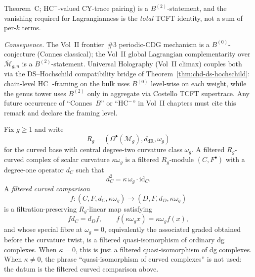\begin{remark}
\begin{enumerate}[label=\textup{(\alph*)}]
Theorem~C; $\mathrm{HC}^-$-valued CY-trace pairing\textup{)} is
a $B^{(2)}$-statement, and the vanishing required for
Lagrangianness is the \emph{total} TCFT identity, not a sum of
per-$k$ terms.
\end{enumerate}
\emph{Consequence.} The Vol~II frontier~\#3 periodic-CDG mechanism is a
$B^{(0)}$-conjecture \textup{(}Connes classical\textup{)}; the Vol~II
global Lagrangian complementarity over
$\overline{\mathcal{M}}_{g,n}$ is a $B^{(2)}$-statement. Universal
Holography \textup{(}Vol~II climax\textup{)} couples both via the
DS--Hochschild compatibility bridge of
Theorem~\ref{thm:chd-ds-hochschild}: chain-level
$\mathrm{HC}^-$-framing on the bulk uses $B^{(0)}$
level-wise on each weight, while the genus tower uses $B^{(2)}$
only in aggregate via Costello TCFT supertrace. Any future
occurrence of ``Connes~$B$'' or ``$\mathrm{HC}^-$'' in Vol~II
chapters must cite this remark and declare the framing level.
\end{remark}

\begin{definition}
\label{def:filtered-curved-comparison}
Fix \(g\geq1\) and write
\[
R_g=(\Omega^\bullet(\overline{\mathcal M}_g),d_{\mathrm{dR}},\omega_g)
\]
for the curved base with central degree-two curvature class
\(\omega_g\).  A filtered \(R_g\)-curved complex of scalar curvature
\(\kappa\omega_g\) is a filtered \(R_g\)-module \((C,F^\bullet)\) with
a degree-one operator \(d_C\) such that
\[
d_C^2=\kappa\,\omega_g\cdot \mathrm{id}_C .
\]
A \emph{filtered curved comparison}
\[
f\colon (C,F,d_C,\kappa\omega_g)\longrightarrow
(D,F,d_D,\kappa\omega_g)
\]
is a filtration-preserving \(R_g\)-linear map satisfying
\[
f d_C=d_D f,\qquad
f(\kappa\omega_g x)=\kappa\omega_g f(x),
\]
and whose special fibre at \(\omega_g=0\), equivalently the associated
graded obtained before the curvature twist, is a filtered
quasi-isomorphism of ordinary dg complexes.  When \(\kappa=0\), this is
just a filtered quasi-isomorphism of dg complexes.  When
\(\kappa\ne0\), the phrase ``quasi-isomorphism of curved complexes'' is
not used: the datum is the filtered curved comparison above.
\end{definition}

